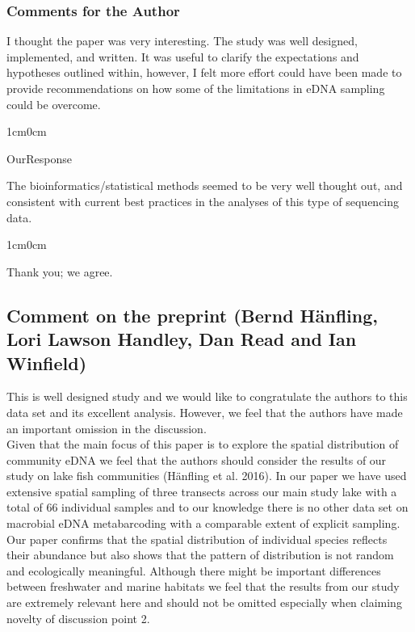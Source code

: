 \documentclass{article}
\newenvironment{response}
	{
	\begin{adjustwidth}{1cm}{0cm}
	\color{peerjBlue}
	}
	{
	\end{adjustwidth}
	}
\begin{document}
\subsubsection*{Comments for the Author}
I thought the paper was very interesting. The study was well designed, implemented, and written. It was useful to clarify the expectations and hypotheses outlined within, however, I felt more effort could have been made to provide recommendations on how some of the limitations in eDNA sampling could be overcome.
\begin{response}
  OurResponse\\
\end{response}

The bioinformatics/statistical methods seemed to be very well thought out, and consistent with current best practices in the analyses of this type of sequencing data.
\begin{response}
	Thank you; we agree.\\
\end{response}


\subsection*{Comment on the preprint (Bernd Hänfling, Lori Lawson Handley, Dan Read and Ian Winfield)}
This is well designed study and we would like to congratulate the authors to this data set and its excellent analysis. However, we feel that the authors have made an important omission in the discussion.\\


Given that the main focus of this paper is to explore the spatial distribution of community eDNA we feel that the authors should consider the results of our study on lake fish communities (Hänfling et al. 2016). In our paper we have used extensive spatial sampling of three transects across our main study lake with a total of 66 individual samples and to our knowledge there is no other data set on macrobial eDNA metabarcoding with a comparable extent of explicit sampling. Our paper confirms that the spatial distribution of individual species reflects their abundance but also shows that the pattern of distribution is not random and ecologically meaningful. Although there might be important differences between freshwater and marine habitats we feel that the results from our study are extremely relevant here and should not be omitted especially when claiming novelty of discussion point 2.\\
\end{document}
